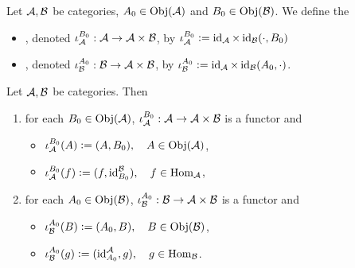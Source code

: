 \documentclass{book}
\begin{document}
	\begin{defn} 
		Let $\mathcal{A}, \mathcal{B}$ be categories, $A_0 \in \operatorname{Obj}(\mathcal{A})$ and $B_0 \in \operatorname{Obj}(\mathcal{B})$. We define the
		\begin{itemize}
			\item {}, denoted $\iota_{\mathcal{A}}^{B_0}: \mathcal{A} \rightarrow \mathcal{A} \times \mathcal{B}$, by 
			$\iota_{\mathcal{A}}^{B_0} \vcentcolon= \operatorname{id}_{\mathcal{A}} \times \operatorname{id}_{\mathcal{B}}(\cdot, B_0)$
			\item {}, denoted $\iota_{\mathcal{B}}^{A_0}: \mathcal{B} \rightarrow \mathcal{A} \times \mathcal{B}$, by $\iota_{\mathcal{B}}^{A_0} \vcentcolon= \operatorname{id}_{\mathcal{A}} \times \operatorname{id}_{\mathcal{B}}(A_0, \cdot)$.
		\end{itemize}
	\end{defn}
	
	\begin{ex} 
		Let $\mathcal{A}, \mathcal{B}$ be categories. Then 
		\begin{enumerate}
			\item for each $B_0 \in \operatorname{Obj}(\mathcal{A})$, $\iota_{\mathcal{A}}^{B_0}:\mathcal{A} \rightarrow \mathcal{A} \times \mathcal{B}$ is a functor and 
			\begin{itemize}
				\item $\iota_{\mathcal{A}}^{B_0}(A) \vcentcolon= (A, B_0), \quad A \in \operatorname{Obj}(\mathcal{A})$,
				\item $\iota_{\mathcal{A}}^{B_0}(f) \vcentcolon= (f, \operatorname{id}_{B_0}^{\mathcal{B}}), \quad f \in \operatorname{Hom}_{\mathcal{A}}$,
			\end{itemize}
			\item for each $A_0 \in \operatorname{Obj}(\mathcal{B})$, $\iota_{\mathcal{B}}^{A_0}:\mathcal{B} \rightarrow \mathcal{A} \times \mathcal{B}$ is a functor and 
			\begin{itemize}
				\item $\iota_{\mathcal{B}}^{A_0}(B) \vcentcolon= (A_0, B), \quad B \in \operatorname{Obj}(\mathcal{B})$,
				\item $\iota_{\mathcal{B}}^{A_0}(g) \vcentcolon= (\operatorname{id}_{A_0}^{\mathcal{A}}, g), \quad g \in \operatorname{Hom}_{\mathcal{B}}$.
			\end{itemize}
		\end{enumerate}
	\end{ex}
	
\end{document}
